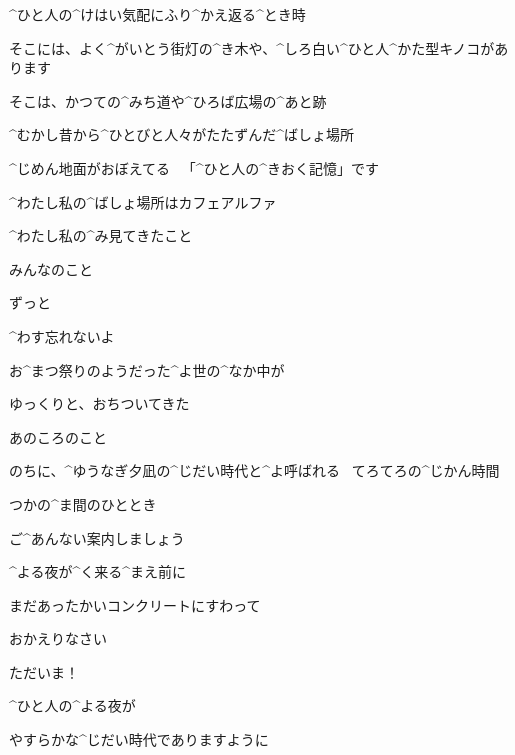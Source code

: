 \Alpha ^{ひと}{人}の^{けはい}{気配}にふり^{かえ}{返}る^{とき}{時}

\Alpha そこには、よく^{がいとう}{街灯}の^{き}{木}や、^{しろ}{白}い^{ひと}{人}^{かた}{型}キノコがあります

\Alpha そこは、かつての^{みち}{道}や^{ひろば}{広場}の^{あと}{跡}

\Alpha ^{むかし}{昔}から^{ひとびと}{人々}がたたずんだ^{ばしょ}{場所}

\Alpha ^{じめん}{地面}がおぼえてる
\ 「^{ひと}{人}の^{きおく}{記憶}」です

\page[149]
\Alpha ^{わたし}{私}の^{ばしょ}{場所}はカフェアルファ

\Alpha ^{わたし}{私}の^{み}{見}てきたこと

\Alpha みんなのこと

\page[150]
\Alpha ずっと

\Alpha ^{わす}{忘}れないよ

\Alpha お^{まつ}{祭}りのようだった^{よ}{世}の^{なか}{中}が

\Alpha ゆっくりと、おちついてきた

\Alpha あのころのこと

\page[151]
\Alpha のちに、^{ゆうなぎ}{夕凪}の^{じだい}{時代}と^{よ}{呼}ばれる
\ てろてろの^{じかん}{時間}

\Alpha つかの^{ま}{間}のひととき

\Alpha ご^{あんない}{案内}しましょう

\Alpha ^{よる}{夜}が^{く}{来}る^{まえ}{前}に

\Alpha まだあったかいコンクリートにすわって

\Kokone おかえりなさい

\page[152]
\Alpha ただいま！

\Alpha ^{ひと}{人}の^{よる}{夜}が

\Alpha やすらかな^{じだい}{時代}でありますように
